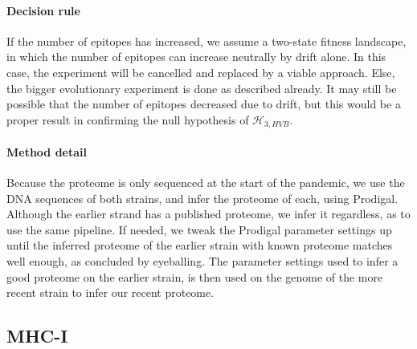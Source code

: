 \documentclass{article}
\newcommand{\richel}[1]{\textcolor{orange}{\textbf{[RB: #1]}}}
\begin{document}
\paragraph{Decision rule}
If the number of epitopes has increased, we assume a two-state fitness landscape,
in which the number of epitopes can increase neutrally by drift alone.
In this case, the experiment will be cancelled and replaced by a 
viable approach.
Else, the bigger evolutionary experiment is done as described already.
It may still be possible that the number of epitopes decreased due to drift,
but this would be a proper result in confirming the null hypothesis
of $\mathcal{H}_{3,HVB}$.

\paragraph{Method detail}
Because the proteome is only sequenced at the start of the pandemic,
we use the DNA sequences of both strains, and infer the proteome
of each, using Prodigal. Although the earlier strand has a published
proteome, we infer it regardless, as to use the same pipeline.
If needed, we tweak the Prodigal parameter settings up until
the inferred proteome of the earlier strain with known proteome
matches well enough, as concluded by eyeballing.
The parameter settings used to infer a good proteome on the earlier
strain, is then used on the genome of the more recent strain 
to infer our recent proteome.

\subsection{MHC-I}

\begin{table}
  
  \caption{
    Percentage of MHC-I epitopes overlapping with transmembrane helix.
    \richel{This is simulated data}
  }
  \label{table:bbbq_1_percentages}
\end{table}

\begin{table}
  
  \caption{
    Kolmogorov-Smirnov test results comparing human and COVID-19 for MHC-I
    \richel{Done on the simulated data}
  }
  \label{table:bbbq_1_stats_covid}
\end{table}
\end{document}

